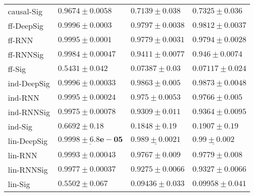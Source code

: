 \begin{tabular}{llll}
causal-Sig     &                            $ 0.9674 \pm 0.0058 $ &                           $ 0.7139 \pm 0.038 $ &                         $ 0.7325 \pm 0.036 $ \\
ff-DeepSig     &                            $ 0.9996 \pm 0.0003 $ &                          $ 0.9797 \pm 0.0038 $ &                        $ 0.9812 \pm 0.0037 $ \\
ff-RNN         &                            $ 0.9995 \pm 0.0001 $ &                          $ 0.9779 \pm 0.0031 $ &                        $ 0.9794 \pm 0.0028 $ \\
ff-RNNSig      &                           $ 0.9984 \pm 0.00047 $ &                          $ 0.9411 \pm 0.0077 $ &                         $ 0.946 \pm 0.0074 $ \\
ff-Sig         &                             $ 0.5431 \pm 0.042 $ &                           $ 0.07387 \pm 0.03 $ &                        $ 0.07117 \pm 0.024 $ \\
ind-DeepSig    &                           $ 0.9996 \pm 0.00033 $ &               $  \mathbf{ 0.9863 \pm 0.005 } $ &            $  \mathbf{ 0.9873 \pm 0.0048 } $ \\
ind-RNN        &                           $ 0.9995 \pm 0.00024 $ &                           $ 0.975 \pm 0.0053 $ &                         $ 0.9766 \pm 0.005 $ \\
ind-RNNSig     &                           $ 0.9975 \pm 0.00078 $ &                           $ 0.9309 \pm 0.011 $ &                        $ 0.9364 \pm 0.0095 $ \\
ind-Sig        &                              $ 0.6692 \pm 0.18 $ &                            $ 0.1848 \pm 0.19 $ &                          $ 0.1907 \pm 0.19 $ \\
lin-DeepSig    &  $  \mathbf{ \underline{ 0.9998 \pm 6.8e-05 }} $ &  $  \mathbf{ \underline{ 0.989 \pm 0.0021 }} $ &  $  \mathbf{ \underline{ 0.99 \pm 0.002 }} $ \\
lin-RNN        &                           $ 0.9993 \pm 0.00043 $ &                           $ 0.9767 \pm 0.009 $ &                         $ 0.9779 \pm 0.008 $ \\
lin-RNNSig     &                           $ 0.9977 \pm 0.00037 $ &                          $ 0.9275 \pm 0.0066 $ &                        $ 0.9327 \pm 0.0066 $ \\
lin-Sig        &                             $ 0.5502 \pm 0.067 $ &                          $ 0.09436 \pm 0.033 $ &                        $ 0.09958 \pm 0.041 $ \\

\end{tabular}
